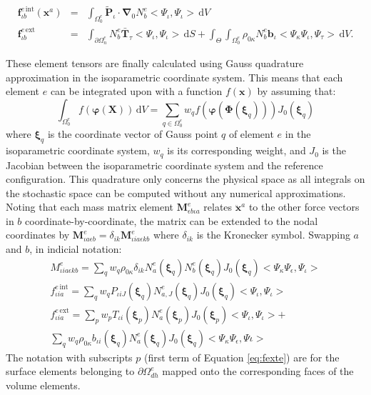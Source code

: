 \documentclass[oneside,11pt,times]{book}
\begin{document}
\begin{eqnarray}
 \bm{f}_{\iota b}^{e\,\text{int}}(\bm{x}^a) & = &  \int_{\Omega_{0}^e} \tilde{\bm{P}}_{\iota} \cdot \bm{\nabla}\!_0 N_b^e <\Psi_{\iota},\Psi_{\iota}> \,  \text{d} V   \label{equationInternalForceVector} \\
 \bm{f}_{\iota b}^{e\,\text{ext}} & = &  \int_{\partial \Omega_{n}^e} N_b^e \bar{\bm{T}}_{\tau}  <\Psi_{\iota},\Psi_{\iota}>\, \text{d} S   +
 \int_{\Theta} \int_{\Omega_{0}^e} \rho_{0\kappa} N_b^e \bm{b}_{\iota} <\Psi_{\kappa}\Psi_{\iota},\Psi_{\tau}> \, \text{d} V  \label{equationExternalForceVector}.
\end{eqnarray}

These element tensors are finally calculated using Gauss quadrature approximation in the isoparametric coordinate system. This means that each element $e$ can be integrated upon with a function $f(\bm{x})$ by assuming that:
\begin{equation} \label{eq:approxElem}
	\int_{\Omega_{0}^e} f(\bm{\varphi}(\bm{X})) \, \text{d} V = \sum_{q \in \Omega_{0}^e} w_q f(\bm{\varphi}(\bm{\Phi}(\bm{\xi}_q))) J_0(\bm{\xi}_q)
\end{equation}
where $\bm{\xi}_q$ is the coordinate vector of Gauss point $q$ of element $e$ in the isoparametric coordinate system, $w_q$ is its corresponding weight, and $J_0$ is the Jacobian between the isoparametric coordinate system and the reference configuration. This quadrature only concerns the physical space as all integrals on the stochastic space can be computed without any numerical approximations. Noting that each mass matrix element $\bm{M}^{e}_{\epsilon b \iota a}$ relates $\ddot{\bm{x}}^a$  to the other force vectors in $b$ coordinate-by-coordinate, the matrix can be extended to the nodal coordinates by $\bm{M}^{e}_{\iota a \epsilon b}=\delta_{ik}\bm{M}^{e}_{ \iota i a \epsilon k b}$ where $\delta_{ik}$ is the Kronecker symbol. Swapping $a$ and $b$, in indicial notation:
%
\begin{equation}
\begin{gathered}
M_{ \iota i a  \epsilon k b}^e =  \sum_q w_q \rho_{0\kappa} \delta_{i k} N^e_{a}(\bm{\xi}_q) N^e_{b}(\bm{\xi}_q) J_0(\bm{\xi}_q) <\Psi_{\kappa}\Psi_{\epsilon},\Psi_{\iota}>  \\
f_{ \iota i a}^{e\, \text{int}} =  \sum_q w_q  P_{\iota iJ}(\bm{\xi}_q) N^e_{a,J}(\bm{\xi}_q) J_0(\bm{\xi}_q) <\Psi_{\iota},\Psi_{\iota}>   \label{eq:finte} \\
f_{ \iota i a}^{e\,\text{ext}} =  \sum_p w_p T_{ \iota i}(\bm{\xi}_p) N^e_{a}(\bm{\xi}_p)  J_0(\bm{\xi}_p) <\Psi_{\iota},\Psi_{\iota}>   + \\  \sum_q w_q \rho_{0\kappa} b_{\iota i}(\bm{\xi}_q) N^e_{a}(\bm{\xi}_q)  J_0(\bm{\xi}_q) <\Psi_{\kappa}\Psi_{\epsilon},\Psi{\iota}>
\end{gathered}
\end{equation}
The notation with subscripts $p$ (first term of Equation \eqref{eq:fexte}) are for the surface elements belonging to  $\partial \Omega_{dh}^e$ mapped onto the corresponding faces of the volume elements.
\end{document}

